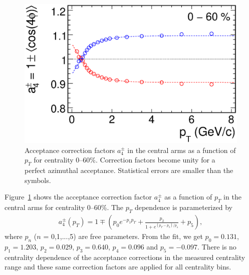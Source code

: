 \documentclass[aps,prc,superscriptaddress,showpacs,floatfix,twocolumn]{revtex4}
\newcommand \pt{\mbox{$p_T$}\xspace}
\begin{document}
\begin{figure}[htbp]
\includegraphics[width=1.0\linewidth]{acceptancecorrection_ptdep_cent0-60.eps}
\caption{\label{fig:acceptancecorrection_ptdep_cent0-60}
Acceptance correction factors $a^{\pm}_4$ in the central arms as 
a function of \pt for centrality 0--60\%. Correction factors 
become unity for a perfect azimuthal acceptance. Statistical 
errors are smaller than the symbols.
}
\end{figure}
Figure~\ref{fig:acceptancecorrection_ptdep_cent0-60} shows the 
acceptance correction factor $a^{\pm}_4$ as a function of \pt in 
the central arms for centrality 0--60\%. The \pt dependence is 
parameterized by
\begin{eqnarray}
a^{\pm}_4(\pt) = 1 \mp \left( p_0e^{-p_1p_T} + \frac{p_2}{1 + e^{(p_T-p_3)/p_4}} + p_5 \right), 
\label{eq:acceptance_correction_v2ep}
\end{eqnarray}
where $p_n$ ($n$ = 0,1,...,5) are free parameters. From the fit, we get
$p_0 = 0.131$,
$p_1 = 1.203$,
$p_2 = 0.029$,
$p_3 = 0.640$,
$p_4 = 0.096$ and
$p_5 = -0.097$.
There is no centrality dependence of the acceptance corrections in the measured
centrality range and these same correction factors are applied for all centrality bins.
\end{document}

